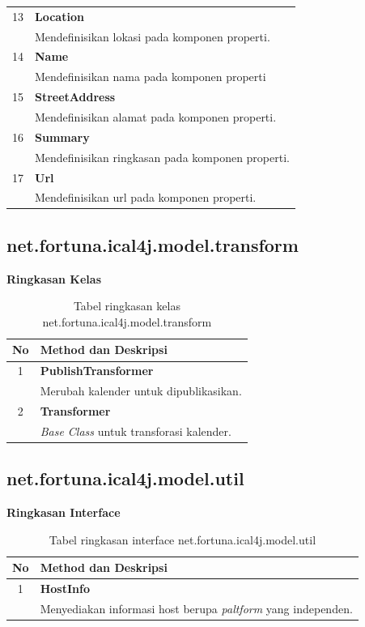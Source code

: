 \begin{table}[H]
\begin{longtable}{|c|p{12cm}|}
		13 & \textbf{Location}\\
			&	Mendefinisikan lokasi pada komponen properti.\\ \hline
		14 & \textbf{Name}\\
			&	Mendefinisikan nama pada komponen properti\\ \hline
		15 & \textbf{StreetAddress}\\
			&	Mendefinisikan alamat pada komponen properti.\\ \hline
		16 & \textbf{Summary}\\
			&	Mendefinisikan ringkasan pada komponen properti.\\ \hline
		17 & \textbf{Url}\\
			&	Mendefinisikan url pada komponen properti.\\ \hline
	\end{longtable}
\end{table}

\subsection{net.fortuna.ical4j.model.transform}
\label{subs:net.fortuna.ical4j.model.transform}
	\noindent \textbf{Ringkasan Kelas}\cite{ical}
	\begin{table}[H]
		\centering
		\caption{Tabel ringkasan kelas net.fortuna.ical4j.model.transform}
		\label{tab:kelas_net.fortuna.ical4j.model.transform}
	\begin{tabular}{|c|p{12cm}|}
		\hline
		\textbf{No} & \textbf{Method dan Deskripsi} \\ \hline \hline
		1 & \textbf{PublishTransformer}\\
			&	Merubah kalender untuk dipublikasikan.\\ \hline
		2 & \textbf{Transformer}\\
			&	\textit{Base Class} untuk transforasi kalender. \\ \hline
		\end{tabular}
	\end{table}	
	
	\subsection{net.fortuna.ical4j.model.util}
\label{subs:net.fortuna.ical4j.model.util}
	\noindent \textbf{Ringkasan Interface}\cite{ical}
	\begin{table}[H]
		\centering
		\caption{Tabel ringkasan interface net.fortuna.ical4j.model.util}
		\label{tab:net.fortuna.ical4j.model.util}
	\begin{tabular}{|c|p{12cm}|}
		\hline
		\textbf{No} & \textbf{Method dan Deskripsi} \\ \hline \hline
		1 & \textbf{HostInfo}\\
			&	Menyediakan informasi host berupa \textit{paltform} yang independen.\\ \hline
	\end{tabular}
\end{table}

